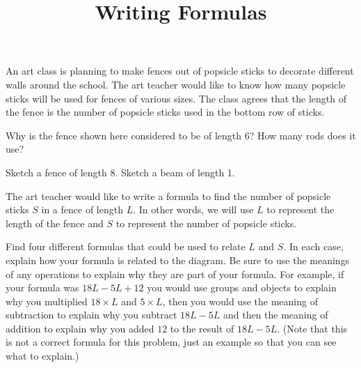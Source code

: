 \documentclass{ximera}
\title{Writing Formulas}
\begin{document}
\begin{abstract} \end{abstract}
\maketitle




An art class is planning to make fences out of popsicle sticks to decorate different walls around the school. The art teacher would like to know how many popsicle sticks will be used for fences of various sizes. The class agrees that the length of the fence is the number of popsicle sticks used in the bottom row of sticks.
\begin{problem}
 Why is the fence shown here considered to be of length 6?  How many rods does it use?

\begin{image}  \end{image}
\end{problem}

\begin{problem}
 Sketch a fence of length 8.  Sketch a beam of length 1.
\end{problem}

\begin{problem}
The art teacher would like to write a formula to find the number of popsicle sticks $S$ in a fence of length $L$. In other words, we will use $L$ to represent the length of the fence and $S$ to represent the number of popsicle sticks.

Find four different formulas that could be used to relate $L$ and $S$. In each case, explain how your formula is related to the diagram. Be sure to use the meanings of any operations to explain why they are part of your formula. For example, if your formula was $18L - 5L + 12$ you would use groups and objects to explain why you multiplied $18 \times L$ and $5 \times L$, then you would use the meaning of subtraction to explain why you subtract $18L - 5L$ and then the meaning of addition to explain why you added $12$ to the result of $18L - 5L$. (Note that this is not a correct formula for this problem, just an example so that you can see what to explain.)
\end{problem}
\end{document}
